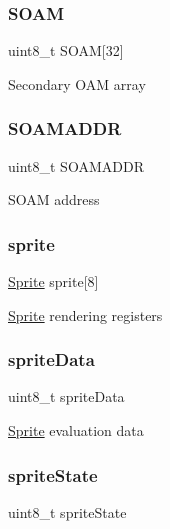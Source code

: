 \subsubsection{\texorpdfstring{S\+O\+AM}{SOAM}}
{\footnotesize\ttfamily uint8\+\_\+t S\+O\+AM\mbox{[}32\mbox{]}}

Secondary O\+AM array \mbox{\label{struct_p_p_u_a496affeb5a831e004a615b888e98e85e}} 
\subsubsection{\texorpdfstring{S\+O\+A\+M\+A\+D\+DR}{SOAMADDR}}
{\footnotesize\ttfamily uint8\+\_\+t S\+O\+A\+M\+A\+D\+DR}

S\+O\+AM address \mbox{\label{struct_p_p_u_ae5755bc7e42d21e0c224ffb1f3dfef35}} 
\subsubsection{\texorpdfstring{sprite}{sprite}}
{\footnotesize\ttfamily \hyperlink{struct_sprite}{Sprite} sprite\mbox{[}8\mbox{]}}

\hyperlink{struct_sprite}{Sprite} rendering registers \mbox{\label{struct_p_p_u_abf381ae655282a3beee0563e6d6bce75}} 
\subsubsection{\texorpdfstring{sprite\+Data}{spriteData}}
{\footnotesize\ttfamily uint8\+\_\+t sprite\+Data}

\hyperlink{struct_sprite}{Sprite} evaluation data \mbox{\label{struct_p_p_u_a22a6738b7311f8741c18f199215724c6}} 
\subsubsection{\texorpdfstring{sprite\+State}{spriteState}}
{\footnotesize\ttfamily uint8\+\_\+t sprite\+State}


